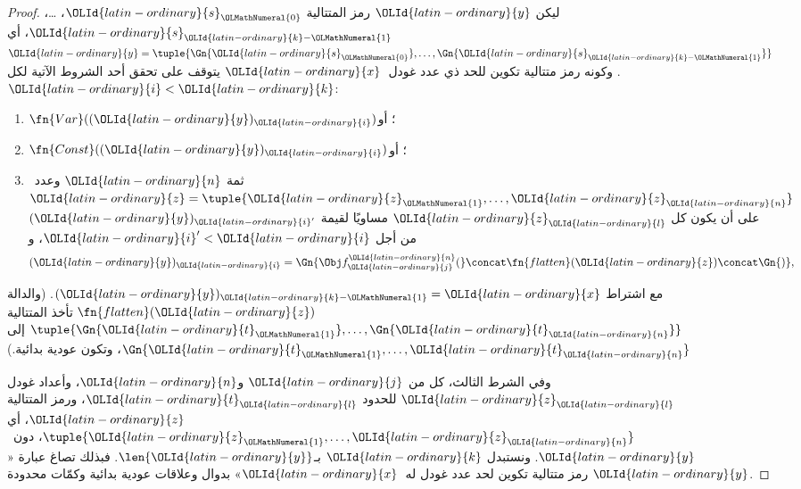 \documentclass[../../../include/open-logic-section]{subfiles}
\begin{document}
\begin{proof}
ليكن ${\OLId{latin-ordinary}{y}}$ رمز المتتالية ${\OLId{latin-ordinary}{s}}_{\OLMathNumeral{0}}$، \dots، ${\OLId{latin-ordinary}{s}}_{{\OLId{latin-ordinary}{k}}-{\OLMathNumeral{1}}}$،
أي ${\OLId{latin-ordinary}{y}}=\tuple{\Gn{{\OLId{latin-ordinary}{s}}_{\OLMathNumeral{0}}}, \dots, \Gn{{\OLId{latin-ordinary}{s}}_{{\OLId{latin-ordinary}{k}}-{\OLMathNumeral{1}}}}}$.
وكونه رمز متتالية تكوين للحد ذي عدد غودل~${\OLId{latin-ordinary}{x}}$
يتوقف على تحقق أحد الشروط الآتية لكل ${\OLId{latin-ordinary}{i}}<{\OLId{latin-ordinary}{k}}$:
\begin{enumerate}
\item $\fn{Var}(({\OLId{latin-ordinary}{y}})_{\OLId{latin-ordinary}{i}})$؛ أو
\item $\fn{Const}(({\OLId{latin-ordinary}{y}})_{\OLId{latin-ordinary}{i}})$؛ أو
\item ثمة ${\OLId{latin-ordinary}{n}}$ وعدد~${\OLId{latin-ordinary}{z}}=\tuple{{\OLId{latin-ordinary}{z}}_{\OLMathNumeral{1}}, \dots, {\OLId{latin-ordinary}{z}}_{\OLId{latin-ordinary}{n}}}$ على أن يكون كل ${\OLId{latin-ordinary}{z}}_{\OLId{latin-ordinary}{l}}$
  مساويًا لقيمة $({\OLId{latin-ordinary}{y}})_{{\OLId{latin-ordinary}{i}}'}$ من أجل ${\OLId{latin-ordinary}{i}}'<{\OLId{latin-ordinary}{i}}$، و
\[
({\OLId{latin-ordinary}{y}})_{\OLId{latin-ordinary}{i}} = \Gn{\Obj f^{\OLId{latin-ordinary}{n}}_{\OLId{latin-ordinary}{j}}(} \concat \fn{flatten}({\OLId{latin-ordinary}{z}}) \concat \Gn{)},
\]
\end{enumerate}
مع اشتراط $({\OLId{latin-ordinary}{y}})_{{\OLId{latin-ordinary}{k}}-{\OLMathNumeral{1}}}={\OLId{latin-ordinary}{x}}$. (والدالة $\fn{flatten}({\OLId{latin-ordinary}{z}})$ تأخذ المتتالية
$\tuple{\Gn{{\OLId{latin-ordinary}{t}}_{\OLMathNumeral{1}}}, \dots, \Gn{{\OLId{latin-ordinary}{t}}_{\OLId{latin-ordinary}{n}}}}$ إلى $\Gn{{\OLId{latin-ordinary}{t}}_{\OLMathNumeral{1}}, \dots, {\OLId{latin-ordinary}{t}}_{\OLId{latin-ordinary}{n}}}$، وتكون
عودية بدائية.)

وفي الشرط الثالث، كل من ${\OLId{latin-ordinary}{j}}$ و${\OLId{latin-ordinary}{n}}$، وأعداد
غودل ${\OLId{latin-ordinary}{z}}_{\OLId{latin-ordinary}{l}}$ للحدود ${\OLId{latin-ordinary}{t}}_{\OLId{latin-ordinary}{l}}$، ورمز المتتالية
${\OLId{latin-ordinary}{z}}$، أي $\tuple{{\OLId{latin-ordinary}{z}}_{\OLMathNumeral{1}}, \dots, {\OLId{latin-ordinary}{z}}_{\OLId{latin-ordinary}{n}}}$،
دون~${\OLId{latin-ordinary}{y}}$. ونستبدل ${\OLId{latin-ordinary}{k}}$ بـ$\len{{\OLId{latin-ordinary}{y}}}$.
فبذلك تصاغ عبارة «${\OLId{latin-ordinary}{y}}$ رمز متتالية تكوين
لحد عدد غودل له~${\OLId{latin-ordinary}{x}}$» بدوال وعلاقات
عودية بدائية وكمّات محدودة.


\end{proof}
\end{document}
